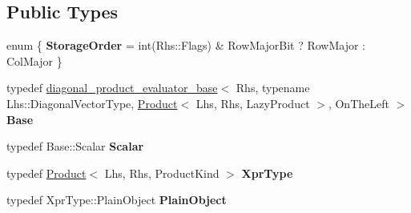 \subsection*{Public Types}
\begin{DoxyCompactItemize}
\item 
\mbox{\label{struct_eigen_1_1internal_1_1product__evaluator_3_01_product_3_01_lhs_00_01_rhs_00_01_product_kinb2964e3ecd5359c634047e003305b765_ad7dfd6b9763fce0ecd3f58d650e98938}} 
enum \{ {\bfseries Storage\+Order} = int(Rhs\+::Flags) \& Row\+Major\+Bit ? Row\+Major \+: Col\+Major
 \}
\item 
\mbox{\label{struct_eigen_1_1internal_1_1product__evaluator_3_01_product_3_01_lhs_00_01_rhs_00_01_product_kinb2964e3ecd5359c634047e003305b765_a8f46f109e5d6cebe949eabe0ad49e7d1}} 
typedef \mbox{\hyperlink{struct_eigen_1_1internal_1_1diagonal__product__evaluator__base}{diagonal\+\_\+product\+\_\+evaluator\+\_\+base}}$<$ Rhs, typename Lhs\+::\+Diagonal\+Vector\+Type, \mbox{\hyperlink{class_eigen_1_1_product}{Product}}$<$ Lhs, Rhs, Lazy\+Product $>$, On\+The\+Left $>$ {\bfseries Base}
\item 
\mbox{\label{struct_eigen_1_1internal_1_1product__evaluator_3_01_product_3_01_lhs_00_01_rhs_00_01_product_kinb2964e3ecd5359c634047e003305b765_a9fff093d43d458bbc59ff47b3e67c404}} 
typedef Base\+::\+Scalar {\bfseries Scalar}
\item 
\mbox{\label{struct_eigen_1_1internal_1_1product__evaluator_3_01_product_3_01_lhs_00_01_rhs_00_01_product_kinb2964e3ecd5359c634047e003305b765_a0fad9ec6b7936bb51b9c27310fcb87d8}} 
typedef \mbox{\hyperlink{class_eigen_1_1_product}{Product}}$<$ Lhs, Rhs, Product\+Kind $>$ {\bfseries Xpr\+Type}
\item 
\mbox{\label{struct_eigen_1_1internal_1_1product__evaluator_3_01_product_3_01_lhs_00_01_rhs_00_01_product_kinb2964e3ecd5359c634047e003305b765_a7ca5c515f8dbee7edf9f85ee3c643810}} 
typedef Xpr\+Type\+::\+Plain\+Object {\bfseries Plain\+Object}
\end{DoxyCompactItemize}
